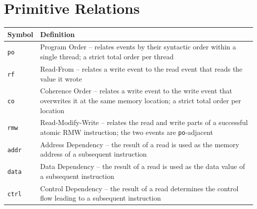\section*{Primitive Relations}
\begin{longtable}{p{2.5cm}p{8cm}}
    \toprule
    Symbol & Definition \\
    \midrule\endhead
    \texttt{po}   & Program Order -- relates events by their syntactic order within a single thread; a strict total order per thread \\
    \midrule
    \texttt{rf}   & Read-From -- relates a write event to the read event that reads the value it wrote \\
    \midrule
    \texttt{co}   & Coherence Order -- relates a write event to the write event that overwrites it at the same memory location; a strict total order per location \\
    \midrule
    \texttt{rmw}  & Read-Modify-Write -- relates the read and write parts of a successful atomic RMW instruction; the two events are \texttt{po}-adjacent \\
    \midrule
    \texttt{addr} & Address Dependency -- the result of a read is used as the memory address of a subsequent instruction \\
    \midrule
    \texttt{data} & Data Dependency -- the result of a read is used as the data value of a subsequent instruction \\
    \midrule
    \texttt{ctrl} & Control Dependency -- the result of a read determines the control flow leading to a subsequent instruction \\
    \bottomrule
\end{longtable}

